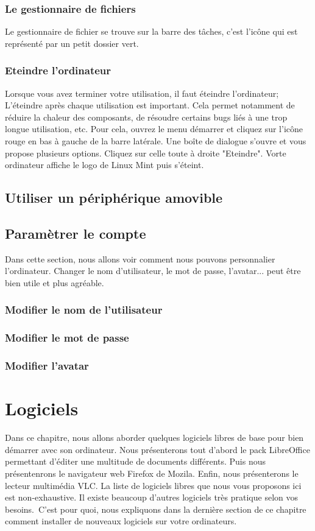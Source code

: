 \documentclass[12pt]{book}
\begin{document}
	\subsection{Le gestionnaire de fichiers}
		Le gestionnaire de fichier se trouve sur la barre des tâches, c'est l'icône qui est représenté par un petit dossier vert.\newline
		
	\subsection{Eteindre l'ordinateur}
		Lorsque vous avez terminer votre utilisation, il faut éteindre l'ordinateur; L'éteindre après chaque utilisation est important. Cela permet notamment de réduire la chaleur des composants, de résoudre certains bugs liés à une trop longue utilisation, etc.\newline
		Pour cela, ouvrez le menu démarrer et cliquez sur l'icône rouge en bas à gauche de la barre latérale.
		Une boîte de dialogue s'ouvre et vous propose plusieurs options.
		Cliquez sur celle toute à droite "Eteindre".
		Vorte ordinateur affiche le logo de Linux Mint puis s'éteint.

\section{Utiliser un périphérique amovible}

\section{Paramètrer le compte}
	Dans cette section, nous allons voir comment nous pouvons personnalier l'ordinateur.
	Changer le nom d'utilisateur, le mot de passe, l'avatar... peut être bien utile et plus agréable.\newline
	\subsection{Modifier le nom de l'utilisateur}
	\subsection{Modifier le mot de passe}
	\subsection{Modifier l'avatar}

\chapter{Logiciels}
Dans ce chapitre, nous allons aborder quelques logiciels libres de base pour bien démarrer avec son ordinateur.
Nous présenterons tout d'abord le pack LibreOffice permettant d'éditer une multitude de documents différents.
Puis nous présentenrons le navigateur web Firefox de Mozila.
Enfin, nous présenterons le lecteur multimédia VLC.
La liste de logiciels libres que nous vous proposons ici est non-exhaustive.
Il existe beaucoup d'autres logiciels très pratique selon vos besoins.\
C'est pour quoi, nous expliquons dans la dernière section de ce chapitre comment installer de nouveaux logiciels sur votre ordinateurs.
\end{document}
